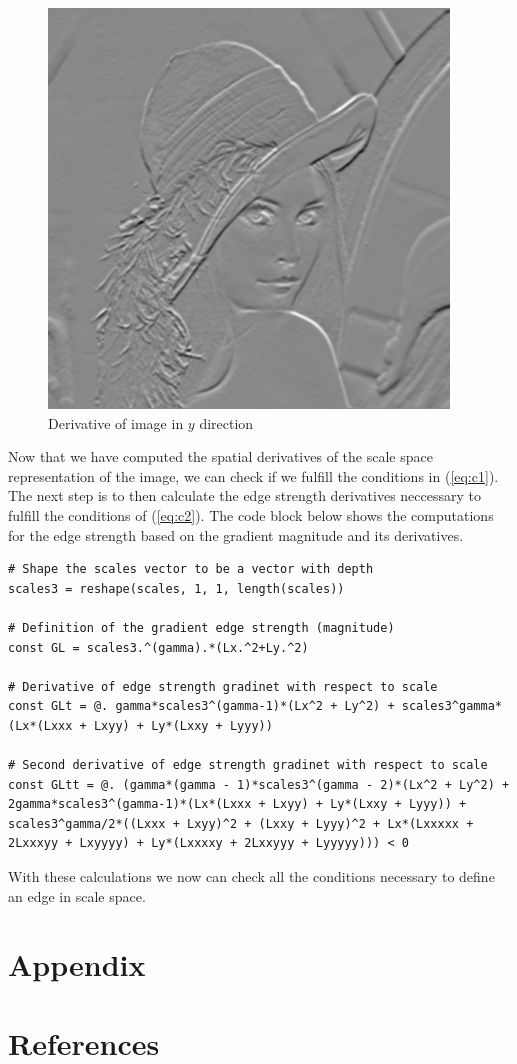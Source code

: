 \documentclass{article}
\begin{document}
\begin{figure}[H]
  \centering
  \includegraphics[scale=0.5]{Images/ly.png}
  \caption{Derivative of image in $y$ direction}
  \label{ly}
\end{figure}

Now that we have computed the spatial derivatives of the scale space representation of the image, we can check if we fulfill the conditions in (\ref{eq:c1}). 
The next step is to then calculate the edge strength derivatives neccessary to fulfill the conditions of (\ref{eq:c2}).
The code block below shows the computations for the edge strength based on the gradient magnitude and its derivatives.

\begin{lstlisting}
# Shape the scales vector to be a vector with depth
scales3 = reshape(scales, 1, 1, length(scales))

# Definition of the gradient edge strength (magnitude)
const GL = scales3.^(gamma).*(Lx.^2+Ly.^2)

# Derivative of edge strength gradinet with respect to scale
const GLt = @. gamma*scales3^(gamma-1)*(Lx^2 + Ly^2) + scales3^gamma*(Lx*(Lxxx + Lxyy) + Ly*(Lxxy + Lyyy))

# Second derivative of edge strength gradinet with respect to scale
const GLtt = @. (gamma*(gamma - 1)*scales3^(gamma - 2)*(Lx^2 + Ly^2) + 2gamma*scales3^(gamma-1)*(Lx*(Lxxx + Lxyy) + Ly*(Lxxy + Lyyy)) + scales3^gamma/2*((Lxxx + Lxyy)^2 + (Lxxy + Lyyy)^2 + Lx*(Lxxxxx + 2Lxxxyy + Lxyyyy) + Ly*(Lxxxxy + 2Lxxyyy + Lyyyyy))) < 0
\end{lstlisting}

With these calculations we now can check all the conditions necessary to define an edge in scale space. 

\section*{Appendix}

% 

\section*{References}
\end{document}
